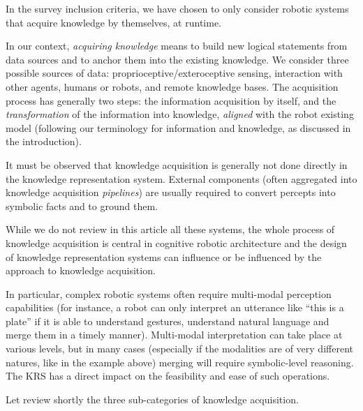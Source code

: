 In the survey inclusion criteria, we have chosen to only consider robotic
systems that acquire knowledge by themselves, at runtime.

In our context, \emph{acquiring knowledge} means to build new logical
statements from data sources and to anchor them into the existing knowledge. We
consider three possible sources of data: proprioceptive/exteroceptive sensing,
interaction with other agents, humans or robots, and remote knowledge bases.
The acquisition process has generally two steps: the information acquisition by
itself, and the \emph{transformation} of the information into knowledge,
\emph{aligned} with the robot existing model (following our terminology for
information and knowledge, as discussed in the introduction).

It must be observed that knowledge acquisition is generally not done directly
in the knowledge representation system. External components (often aggregated
into knowledge acquisition \emph{pipelines}) are usually required to convert
percepts into symbolic facts and to ground them.

While we do not review in this article all these systems, the whole process of
knowledge acquisition is central in cognitive robotic architecture and the
design of knowledge representation systems can influence or be influenced by
the approach to knowledge acquisition.

In particular, complex robotic systems often require multi-modal perception
capabilities (for instance, a robot can only interpret an utterance like ``this
is a plate'' if it is able to understand gestures, understand natural language
and merge them in a timely manner). Multi-modal interpretation can take place
at various levels, but in many cases (especially if the modalities are of very
different natures, like in the example above) merging will require
symbolic-level reasoning. The KRS has a direct impact on the feasibility and
ease of such operations.

Let review shortly the three sub-categories of knowledge acquisition.

\begin{scriptsize}
\begin{center}
\end{center}
\end{scriptsize}

